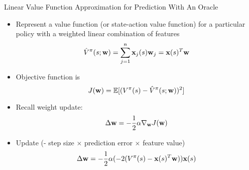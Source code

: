\documentclass[aspectratio=169]{../latex_main/tntbeamer}  %
\begin{document}
\begin{frame}[c]{Linear Value Function Approximation for Prediction With
		An Oracle}
	
	
	\begin{itemize}
		\item Represent a value function (or state-action value function) for a
		particular policy with a weighted linear combination of features
		$$ \hat{V}^\pi(s; \mathbf{w}) = \sum_{j=1}^n \mathbf{x}_j (s) \mathbf{w}_j = \mathbf{x}(s)^T\mathbf{w}$$
		\item Objective function is 
		$$ J(\mathbf{w}) = \mathbb{E}[(V^\pi(s) - \hat{V}^\pi(s; \mathbf{w}))^2]$$
		\item Recall weight update:
		$$ \Delta \mathbf{w} = - \frac{1}{2} \alpha \nabla_{\mathbf{w}} J (\mathbf{w})$$
		\item Update (- step size $\times$ prediction error $\times$ feature value)
		$$ \Delta \mathbf{w} = -\frac{1}{2} \alpha(-2(V^\pi(s) - \mathbf{x}(s)^T \mathbf{w})) \mathbf{x}(s)$$
		
	\end{itemize}
	
\end{frame}
\end{document}
